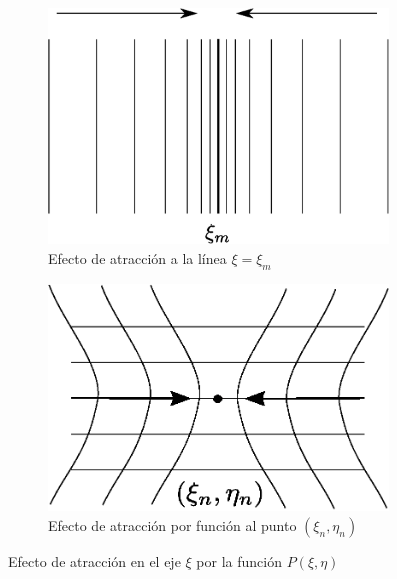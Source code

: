 \documentclass[letterpaper, openright, 12pt]{book}
\begin{document}
    \begin{figure}[htbp!]
        \centering
        \begin{subfigure}[c]{0.45\textwidth}
            \includegraphics[keepaspectratio,
                width=0.99\textwidth]{./img/densidad-xi-linea}
            \caption{Efecto de atracción a la línea $\xi = \xi_m$}
            \label{fig:densidad-xi-linea}
        \end{subfigure}
        \hfill
        \begin{subfigure}[c]{0.45\textwidth}
            \includegraphics[keepaspectratio, 
                width=0.99\textwidth]{./img/densidad-xi-punto}
            \caption{Efecto de atracción por función al punto
                $(\xi_n, \eta_n)$}
            \label{fig:densidad-xi-punto}
        \end{subfigure}
        \caption[Efecto de atracción por función $P(\xi, \eta)$]{Efecto de
            atracción en el eje $\xi$ por la función $P(\xi, \eta)$}
    \end{figure}
\end{document}
